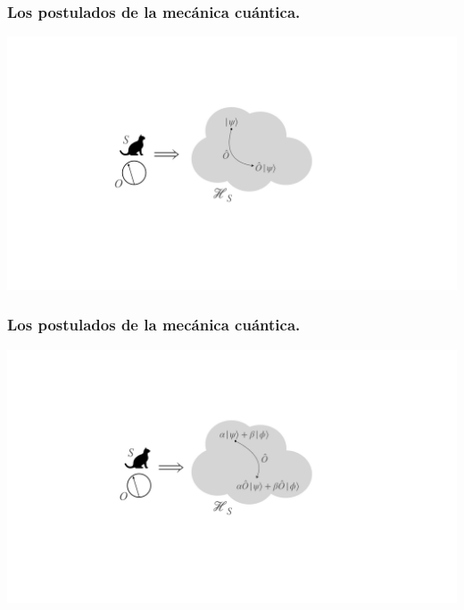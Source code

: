 \documentclass{beamer}
\begin{document}
\begin{frame}
    \frametitle{Los postulados de la mecánica cuántica.}
    \begin{center}
        \includegraphics[scale=0.3]{figs/cats_09.pdf}
    \end{center}

\end{frame}

\begin{frame}
    \frametitle{Los postulados de la mecánica cuántica.}
    \begin{center}
        \includegraphics[scale=0.3]{figs/cats_10.pdf}
    \end{center}

\end{frame}
\end{document}
